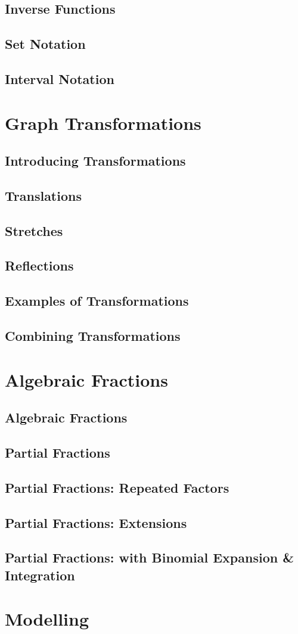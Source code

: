 \documentclass[../maths.tex]{subfiles}
\begin{document}
\subsection*{Inverse Functions}
\subsection*{Set Notation}
\subsection*{Interval Notation}
\section{Graph Transformations}
\subsection*{Introducing Transformations}
\subsection*{Translations}
\subsection*{Stretches}
\subsection*{Reflections}
\subsection*{Examples of Transformations}
\subsection*{Combining Transformations}
\section{Algebraic Fractions}
\subsection*{Algebraic Fractions}
\subsection*{Partial Fractions}
\subsection*{Partial Fractions: Repeated Factors}
\subsection*{Partial Fractions: Extensions}
\subsection*{Partial Fractions: with Binomial Expansion \& Integration}
\section{Modelling}
\end{document}

